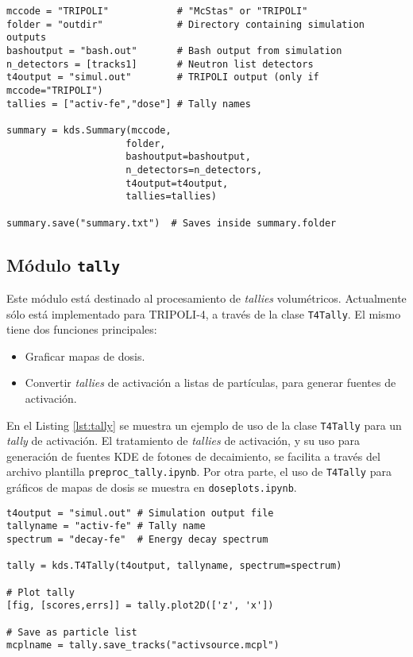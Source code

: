 \begin{lstlisting}[language=Python2, label={lst:summary}, caption=Ejemplo de uso de \texttt{Summary}.]
mccode = "TRIPOLI"            # "McStas" or "TRIPOLI"
folder = "outdir"             # Directory containing simulation outputs
bashoutput = "bash.out"       # Bash output from simulation
n_detectors = [tracks1]       # Neutron list detectors
t4output = "simul.out"        # TRIPOLI output (only if mccode="TRIPOLI")
tallies = ["activ-fe","dose"] # Tally names

summary = kds.Summary(mccode,
                     folder,
                     bashoutput=bashoutput, 
                     n_detectors=n_detectors, 
                     t4output=t4output,
                     tallies=tallies)

summary.save("summary.txt")  # Saves inside summary.folder
\end{lstlisting}


\subsection{Módulo \texttt{tally}}

Este módulo está destinado al procesamiento de \emph{tallies} volumétricos. Actualmente sólo está implementado para TRIPOLI-4, a través de la clase \verb|T4Tally|. El mismo tiene dos funciones principales:
\begin{itemize}
	\item Graficar mapas de dosis.
	\item Convertir \emph{tallies} de activación a listas de partículas, para generar fuentes de activación.
\end{itemize}

En el Listing \ref{lst:tally} se muestra un ejemplo de uso de la clase \verb|T4Tally| para un \emph{tally} de activación. El tratamiento de \emph{tallies} de activación, y su uso para generación de fuentes KDE de fotones de decaimiento, se facilita a través del archivo plantilla \verb|preproc_tally.ipynb|. Por otra parte, el uso de \verb|T4Tally| para gráficos de mapas de dosis se muestra en \verb|doseplots.ipynb|.

\begin{lstlisting}[language=Python2, label={lst:tally}, caption=Ejemplo de uso de \texttt{T4Tally}.]
t4output = "simul.out" # Simulation output file
tallyname = "activ-fe" # Tally name
spectrum = "decay-fe"  # Energy decay spectrum

tally = kds.T4Tally(t4output, tallyname, spectrum=spectrum)

# Plot tally
[fig, [scores,errs]] = tally.plot2D(['z', 'x'])

# Save as particle list
mcplname = tally.save_tracks("activsource.mcpl")
\end{lstlisting}


